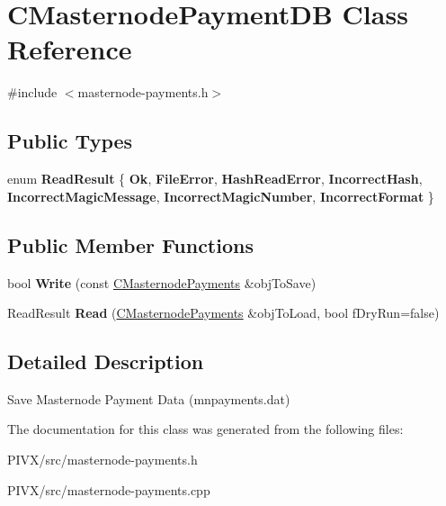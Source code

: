 \hypertarget{class_c_masternode_payment_d_b}{}\section{C\+Masternode\+Payment\+DB Class Reference}
\label{class_c_masternode_payment_d_b}


{\ttfamily \#include $<$masternode-\/payments.\+h$>$}

\subsection*{Public Types}
\begin{DoxyCompactItemize}
\item 
\mbox{\label{class_c_masternode_payment_d_b_acfe5000604cd3e49a896fc222fadeb5e}} 
enum {\bfseries Read\+Result} \{ \newline
{\bfseries Ok}, 
{\bfseries File\+Error}, 
{\bfseries Hash\+Read\+Error}, 
{\bfseries Incorrect\+Hash}, 
\newline
{\bfseries Incorrect\+Magic\+Message}, 
{\bfseries Incorrect\+Magic\+Number}, 
{\bfseries Incorrect\+Format}
 \}
\end{DoxyCompactItemize}
\subsection*{Public Member Functions}
\begin{DoxyCompactItemize}
\item 
\mbox{\label{class_c_masternode_payment_d_b_abf4ab2342aa350936b99b8d04ec2554d}} 
bool {\bfseries Write} (const \mbox{\hyperlink{class_c_masternode_payments}{C\+Masternode\+Payments}} \&obj\+To\+Save)
\item 
\mbox{\label{class_c_masternode_payment_d_b_a5b6f77de6ff3a59ef49fe28d748ccefb}} 
Read\+Result {\bfseries Read} (\mbox{\hyperlink{class_c_masternode_payments}{C\+Masternode\+Payments}} \&obj\+To\+Load, bool f\+Dry\+Run=false)
\end{DoxyCompactItemize}


\subsection{Detailed Description}
Save Masternode Payment Data (mnpayments.\+dat) 

The documentation for this class was generated from the following files\+:\begin{DoxyCompactItemize}
\item 
P\+I\+V\+X/src/masternode-\/payments.\+h\item 
P\+I\+V\+X/src/masternode-\/payments.\+cpp\end{DoxyCompactItemize}
